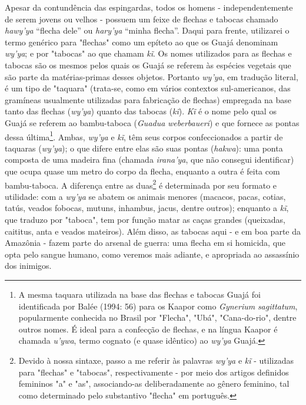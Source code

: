 Apesar da contundência das espingardas, todos os homens -
independentemente de serem jovens ou velhos - possuem um feixe de
flechas e tabocas chamado \emph{hawy'ya} ``flecha dele'' ou
\emph{hary'ya} ``minha flecha''. Daqui para frente, utilizarei o termo
genérico para "flechas" como um epíteto ao que os Guajá denominam
\emph{wy'ya}; e por "tabocas" ao que chamam \emph{kĩ}. Os nomes
utilizados para as flechas e tabocas são os mesmos pelos quais os Guajá
se referem às espécies vegetais que são parte da matérias-primas desses
objetos. Portanto \emph{wy'ya}, em tradução literal, é um tipo de
"taquara" (trata-se, como em vários contextos sul-americanos, das
gramíneas usualmente utilizadas para fabricação de flechas) empregada na
base tanto das flechas (\emph{wy'ya}) quanto das tabocas (\emph{kĩ}).
\emph{Kĩ} é o nome pelo qual os Guajá se referem ao bambu-taboca
(\emph{Guadua} \emph{weberbaueri}) e que fornece as pontas dessa
última\footnote{A mesma taquara utilizada na base das flechas e tabocas
  Guajá foi identificada por Balée (1994: 56) para os Kaapor como
  \emph{Gynerium} \emph{sagittatum}, popularmente conhecida no Brasil
  por "Flecha", "Ubá", "Cana-do-rio", dentre outros nomes. É ideal para
  a confecção de flechas, e na língua Kaapor é chamada \emph{u'ywa},
  termo cognato (e quase idêntico) ao \emph{wy'ya} Guajá.}. Ambas,
\emph{wy'ya} e \emph{kĩ}, têm seus corpos confeccionados a partir de
taquaras (\emph{wy'ya}); o que difere entre elas são suas pontas
(\emph{hakwa}): uma ponta composta de uma madeira fina (chamada
\emph{irana'ya}, que não consegui identificar) que ocupa quase um metro
do corpo da flecha, enquanto a outra é feita com bambu-taboca. A
diferença entre as duas\footnote{Devido à nossa sintaxe, passo a me
  referir às palavras \emph{wy'ya} e \emph{kĩ} - utilizadas para
  "flechas" e "tabocas", respectivamente - por meio dos artigos
  definidos femininos "a" e "as", associando-as deliberadamente ao
  gênero feminino, tal como determinado pelo substantivo "flecha" em
  português.} é determinada por seu formato e utilidade: com a
\emph{wy'ya} se abatem os animais menores (macacos, pacas, cotias,
tatús, veados fobocas, mutuns, inhambus, jacus, dentre outros); enquanto
a \emph{kĩ}, que traduzo por "taboca", tem por função matar as caças
grandes (queixadas, caititus, anta e veados mateiros). Além disso, as
tabocas aqui - e em boa parte da Amazônia - fazem parte do arsenal de
guerra: uma flecha em si homicida, que opta pelo sangue humano, como
veremos mais adiante, e apropriada ao assassínio dos inimigos.

